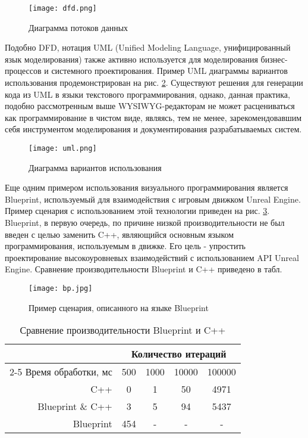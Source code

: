 
\begin{figure}[htbp]
	\centering
	\texttt{[image: dfd.png]}
	\caption{Диаграмма потоков данных}%
	\label{fig:dfd}
\end{figure}

Подобно DFD, нотация UML (Unified Modeling Language, унифицированный язык моделирования) также активно используется для моделирования бизнес-процессов и системного проектирования. Пример UML диаграммы вариантов использования продемонстрирован на рис. \ref{fig:uml}. Существуют решения \cite{uml} для генерации кода из UML в языки текстового программирования, однако, данная практика, подобно рассмотренным выше WYSIWYG-редакторам не может расцениваться как программирование в чистом виде, являясь, тем не менее, зарекомендовавшим себя инструментом моделирования и документирования разрабатываемых систем.


\begin{figure}[htbp]
	\centering
	\texttt{[image: uml.png]}
	\caption{Диаграмма вариантов использования}%
	\label{fig:uml}
\end{figure}

Еще одним примером использования визуального программирования является Blueprint, используемый для взаимодействия с игровым движком Unreal Engine. Пример сценария с использованием этой технологии приведен на рис. \ref{fig:bp}. Blueprint, в первую очередь, по причине низкой производительности \cite{bptb} не был введен с целью заменить C++, являющийся основным языком программирования, используемым в движке. Его цель - упростить проектирование высокоуровневых взаимодействий с использованием API Unreal Engine. Сравнение производительности Blueprint и C++ приведено в табл.

\begin{figure}[htbp]
	\centering
	\texttt{[image: bp.jpg]}
	\caption{Пример сценария, описанного на языке Blueprint}%
	\label{fig:bp}
\end{figure}

\begin{table}
\captionsetup{skip=5pt, labelformat=empty,justification=centering,format=plain}
\centering
\caption{Сравнение производительности Blueprint и C++}	
\begin{tabular}{|r|c|c|c|c|}
\hline
            \multirow{2}{*}{} 
           & \multicolumn{4}{c|}{Количество итераций} \\ \cline{2-5}
Время обработки, мс & 500   & 1000  & 10000 & 100000  \\ \hline
C++		  			& 0    	& 1     & 50    & 4971     \\ \hline
Blueprint \& C++	& 3    	& 5     & 94    & 5437     \\ \hline
Blueprint			& 454   & -     & -     & -      \\ \hline
\end{tabular}
\end{table}


